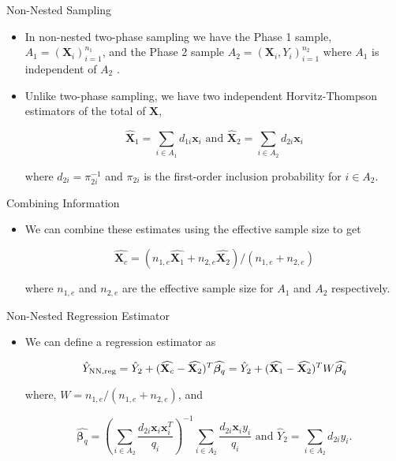\documentclass{beamer} %
\renewcommand{\bf}[1]{\mathbf{#1}}
\begin{document}
\begin{frame}{Non-Nested Sampling}

  \begin{itemize}
    \item In non-nested two-phase sampling we have the Phase 1 sample,
      $A_1 = (\bf X_i)_{i = 1}^{n_1}$, and the Phase 2 sample $A_2 = (\bf X_i,
      Y_i)_{i = 1}^{n_2}$ where $A_1$ is independent of $A_2$
      \autocite{hidiroglou2001double}.
    \item Unlike two-phase sampling, we have
      two independent Horvitz-Thompson estimators of the total of $\bf X$,

    $$\widehat{\bf X}_1 = \sum_{i \in A_1} d_{1i} \bf x_i \text{ and } 
      \widehat{\bf X}_2 = \sum_{i \in A_2} d_{2i} \bf x_i $$

      where $d_{2i} = \pi_{2i}^{-1}$ and $\pi_{2i}$ is the first-order inclusion
      probability for $i \in A_2$.
  \end{itemize}

\end{frame}

\begin{frame}{Combining Information}
  \label{slide:combinf}

  \begin{itemize}
    \item We can combine these estimates using the effective sample size 
    \autocite{kish1965survey} to get

    $$\widehat{\bf X_c} = (n_{1, e} \widehat{\bf X_1} + n_{2, e}\widehat{\bf
    X_2}) / (n_{1, e} + n_{2, e})$$

    where $n_{1, e}$ and $n_{2, e}$ are the effective
    sample size for $A_1$ and $A_2$ respectively. 

  \end{itemize}
\end{frame}

\begin{frame}{Non-Nested Regression Estimator}
  \label{slide:nnre}
  \begin{itemize}
    \item We can define a regression estimator as

    $$
    \hat Y_{\rm{NN, reg}} = \hat Y_2 + 
    (\widehat{\bf X_c} - \widehat{\bf X_2})^T \widehat{\bm \beta_q} = 
    \hat Y_2 + (\widehat{\bf X_1} - \widehat{\bf X_2})^T W\widehat{\bm \beta_q}
    $$

    where, $W = n_{1, e} / (n_{1, e} + n_{2, e})$, and

    $$
    \widehat{\bm \beta_q} = \left(\sum_{i \in A_2} 
    \frac{d_{2i}\bf x_i \bf x_i^T}{q_i}\right)^{-1} 
    \sum_{i \in A_2} \frac{d_{2i}\bf x_i y_i}{q_i} \text{ and }
    \hat Y_2 = \sum_{i \in A_2} d_{2i} y_i. 
    $$
  \end{itemize}
\end{frame}
\end{document}
